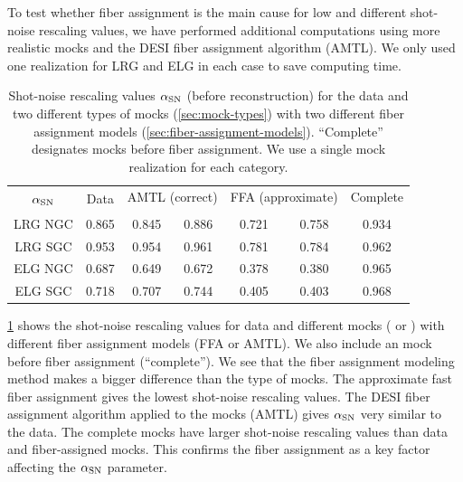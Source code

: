 To test whether fiber assignment is the main cause for low and different shot-noise rescaling values, we have performed additional \rascalc{} computations using more realistic \abacus{} mocks and the DESI fiber assignment algorithm (AMTL).
We only used one realization for LRG and ELG in each case to save computing time.

\begin{table}[tb!]
    \centering
    \begin{tabular}{|c|c|c|c|c|c|c|}
\hline
\multirow{2}{*}{$\alpha_{\rm SN}$} & \multirow{2}{*}{Data} & \multicolumn{2}{|c|}{AMTL (correct)} & \multicolumn{2}{|c|}{FFA (approximate)} & Complete \\
\cline{3-7}
 &  & \abacus{} & \ezmocks{} & \abacus{} & \ezmocks{} & \abacus{} \\
\hline
LRG NGC & 0.865 & 0.845 & 0.886 & 0.721 & 0.758 & 0.934 \\
\hline
LRG SGC & 0.953 & 0.954 & 0.961 & 0.781 & 0.784 & 0.962 \\
\hline
ELG NGC & 0.687 & 0.649 & 0.672 & 0.378 & 0.380 & 0.965 \\
\hline
ELG SGC & 0.718 & 0.707 & 0.744 & 0.405 & 0.403 & 0.968 \\
\hline
    \end{tabular}
    \caption[Shot-noise rescaling values for the data and two different types of mocks with two different fiber assignment models]{Shot-noise rescaling values $\alpha_{\rm SN}$ (before reconstruction) for the data and two different types of mocks (\cref{sec:mock-types}) with two different fiber assignment models (\cref{sec:fiber-assignment-models}).
    ``Complete'' designates mocks before fiber assignment.
    We use a single mock realization for each category.}
    \label{tab:shot-noise-rescaling-ffa-altmtl}
\end{table}

\cref{tab:shot-noise-rescaling-ffa-altmtl} shows the shot-noise rescaling values for data and different mocks (\abacus{} or \ezmocks{}) with different fiber assignment models (FFA or AMTL).
We also include an \abacus{} mock before fiber assignment (``complete'').
We see that the fiber assignment modeling method makes a bigger difference than the type of mocks.
The approximate fast fiber assignment gives the lowest shot-noise rescaling values.
The DESI fiber assignment algorithm applied to the mocks (AMTL) gives $\alpha_{\rm SN}$ very similar to the data.
The complete \abacus{} mocks have larger shot-noise rescaling values than data and fiber-assigned mocks.
This confirms the fiber assignment as a key factor affecting the $\alpha_{\rm SN}$ parameter.

